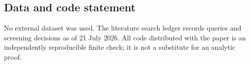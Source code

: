 \subsection{Data and code statement}

No external dataset was used.  The literature search ledger records queries
and screening decisions as of 21 July 2026.  All code distributed with the
paper is an independently reproducible finite check; it is not a substitute
for an analytic proof.
